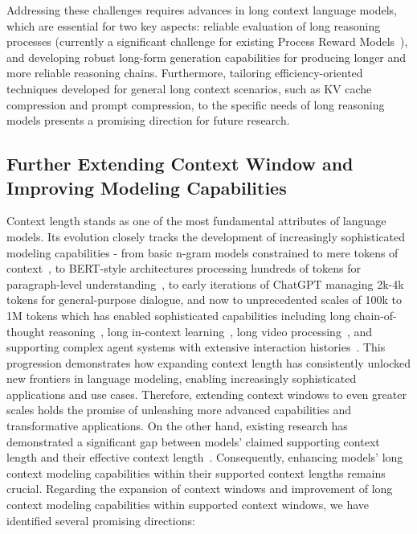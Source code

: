 \documentclass[11pt, a4paper, logo, copyright, nonumbering]{map}
\begin{document}
Addressing these challenges requires advances in long context language models, which are essential for two key aspects: reliable evaluation of long reasoning processes (currently a significant challenge for existing Process Reward Models~\citep{he2025can}), and developing robust long-form generation capabilities for producing longer and more reliable reasoning chains. Furthermore, tailoring efficiency-oriented techniques developed for general long context scenarios, such as KV cache compression and prompt compression, to the specific needs of long reasoning models presents a promising direction for future research.





\subsection{Further Extending Context Window and Improving Modeling Capabilities}
Context length stands as one of the most fundamental attributes of language models. Its evolution closely tracks the development of increasingly sophisticated modeling capabilities - from basic n-gram models constrained to mere tokens of context~\citep{brants2007large}, to BERT-style architectures processing hundreds of tokens for paragraph-level understanding~\citep{devlin-etal-2019-bert}, to early iterations of ChatGPT managing 2k-4k tokens for general-purpose dialogue, and now to unprecedented scales of 100k to 1M tokens which has enabled sophisticated capabilities including long chain-of-thought reasoning~\citep{guo2025deepseek}, long in-context learning~\citep{team2024gemini}, long video processing~\citep{Qwen2.5-VL}, and supporting complex agent systems with extensive interaction histories~\citep{oai2025deepresearch}. This progression demonstrates how expanding context length has consistently unlocked new frontiers in language modeling, enabling increasingly sophisticated applications and use cases. Therefore, extending context windows to even greater scales holds the promise of unleashing more advanced capabilities and transformative applications.
On the other hand, existing research has demonstrated a significant gap between models' claimed supporting context length and their effective context length~\citep{hsieh2024ruler,an2024does}. Consequently, enhancing models' long context modeling capabilities within their supported context lengths remains crucial. Regarding the expansion of context windows and improvement of long context modeling capabilities within supported context windows, we have identified several promising directions:
\end{document}
